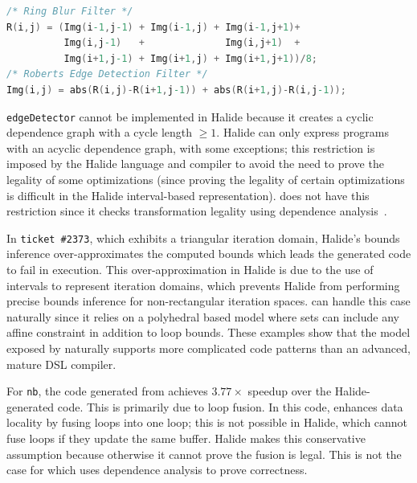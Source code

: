 \vspace{-0.15cm}
\begin{lstlisting}[language=C,escapechar=@,numbers=none]
/* Ring Blur Filter */
R(i,j) = (Img(i-1,j-1) + Img(i-1,j) + Img(i-1,j+1)+
          Img(i,j-1)   +              Img(i,j+1)  +
          Img(i+1,j-1) + Img(i+1,j) + Img(i+1,j+1))/8;
/* Roberts Edge Detection Filter */
Img(i,j) = abs(R(i,j)-R(i+1,j-1)) + abs(R(i+1,j)-R(i,j-1));
\end{lstlisting}
\vspace{-0.15cm}

\texttt{edgeDetector} cannot be implemented in Halide because it creates a cyclic dependence graph with a cycle length $\geq 1$.
Halide can only express programs with an acyclic dependence graph, with some exceptions;  this restriction is imposed by the Halide language and compiler to avoid the need to prove the legality of some optimizations (since proving the legality of certain optimizations is difficult in the Halide interval-based representation).
\framework{} does not have this restriction since it checks transformation legality using dependence analysis~\cite{feautrier_dataflow_1991}.

In \texttt{ticket \#2373}, which exhibits a triangular iteration domain,  Halide's bounds inference over-approximates the computed bounds which leads the generated code to fail in execution.  This over-approximation in Halide is due to the use of intervals to represent iteration domains, which prevents Halide from performing precise bounds inference for non-rectangular iteration spaces.  \framework{} can handle this case naturally since it relies on a polyhedral based model where sets can include any affine constraint  in addition to loop bounds.  These examples show that the model exposed by \framework{} naturally supports more complicated code patterns than an advanced, mature DSL compiler.

For \texttt{nb}, the code generated from \framework{} achieves $3.77\times$ speedup over the Halide-generated code. This is primarily due to loop fusion.  In this code, \framework{} enhances data locality by fusing loops into one loop;  this is not possible in Halide, which cannot fuse loops if they update the same buffer.  Halide makes this conservative assumption because otherwise it cannot prove the fusion is legal. This is not the case for \framework{} which uses dependence analysis to prove correctness.

